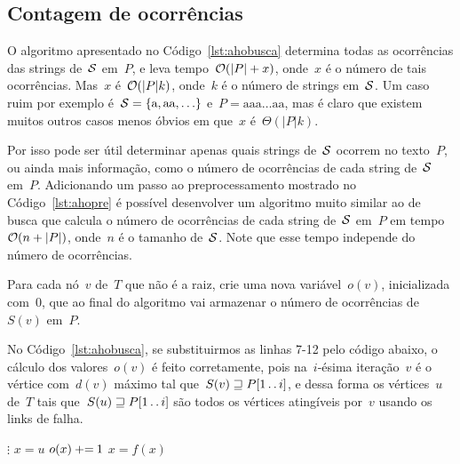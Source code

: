 \subsection{Contagem de ocorrências}

O algoritmo apresentado no Código~\ref{lst:ahobusca} determina todas as ocorrências das strings de~$\mathcal{S}$ em~$P$, e leva tempo~$\mathcal{O}(|P| + x)$, onde~$x$ é o número de tais ocorrências. Mas~$x$ é~$\mathcal{O}(|P|k)$, onde~$k$ é o número de strings em~$\mathcal{S}$. Um caso ruim por exemplo é~$\mathcal{S} = \{\text{a}, \text{aa}, \ldots\}$ e~${P = \text{aaa}\ldots\text{aa}}$, mas é claro que existem muitos outros casos menos óbvios em que~$x$ é~$\Theta(|P|k)$.

Por isso pode ser útil determinar apenas quais strings de~$\mathcal{S}$ ocorrem no texto~$P$, ou ainda mais informação, como o número de ocorrências de cada string de~$\mathcal{S}$ em~$P$. Adicionando um passo ao preprocessamento mostrado no Código~\ref{lst:ahopre} é possível desenvolver um algoritmo muito similar ao de busca que calcula o número de ocorrências de cada string de~$\mathcal{S}$ em~$P$ em tempo~$\mathcal{O}(n + |P|)$, onde~$n$ é o tamanho de~$\mathcal{S}$. Note que esse tempo independe do número de ocorrências.

Para cada nó~$v$ de~$T$ que não é a raiz, crie uma nova variável~$o(v)$, inicializada com~$0$, que ao final do algoritmo vai armazenar o número de ocorrências de~$S(v)$ em~$P$.

No Código~\ref{lst:ahobusca}, se substituirmos as linhas 7-12 pelo código abaixo, o cálculo dos valores~$o(v)$ é feito corretamente, pois na~$i$-ésima iteração~$v$ é o vértice com~$d(v)$ máximo tal que~$S(v) \sqsupseteq P[1\,.\,.\, i]$, e dessa forma os vértices~$u$ de~$T$ tais que~$S(u) \sqsupseteq P[1\,.\,.\, i]$ são todos os vértices atingíveis por~$v$ usando os links de falha.


\begin{algorithm}
\begin{algorithmic}[1]
\makeatletter
\setcounter{ALG@line}{4}
\makeatother
\Indent
    \State $\vdots$
    \State $x = u$
        \State $o(x) \mathbin{{\tiny +}{=}} 1$
        \State $x = f(x)$
    \EndWhile
\EndIndent
\end{algorithmic}
\end{algorithm}


